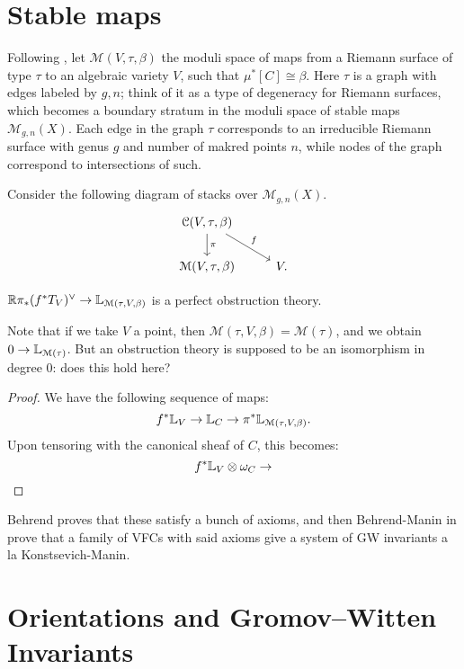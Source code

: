 \section{Stable maps}
Following \cite{bm_stacks}, let $\mathcal{M}(V,\tau,\beta)$ the moduli space of maps from a Riemann 
surface of type $\tau$ to an algebraic variety $V$,
such that $\mu^*[C] \cong \beta$. Here $\tau$ is a graph with edges labeled by $g,n$; think of it as a type of degeneracy
for Riemann surfaces, which becomes a boundary stratum in the moduli space of stable maps $\mathcal{M}_{g,n}(X)$. 
Each edge in the graph $\tau$ corresponds to an irreducible Riemann surface with genus $g$ 
and number of makred points $n$, while nodes of the graph correspond to intersections of such.

Consider the following diagram of stacks over $\mathcal{M}_{g,n}(X)$.
\[
\begin{tikzcd}
\mathcal{C}(V,\tau,\beta)\arrow{d}{\pi} \arrow{dr}{f} & \\ \mathcal{M}(V,\tau,\beta) & V .
\end{tikzcd}
\]

\begin{prop}
\label{prop:stable_maps_standard_obstruction}
$\mathbb R\pi_*(f^*T_V)^{\vee} \to \mathbb L_{\mathcal{M}(\tau,V,\beta)}$ is a perfect obstruction theory.
\end{prop}

\begin{rem}
Note that if we take
$V$ a point, then $\mathcal{M}(\tau,V,\beta) = \mathcal{M}(\tau)$, and we obtain $0 \to \mathbb L_{\mathcal{M}(\tau)}$.
But an obstruction theory is supposed to be an isomorphism in degree 0: does this hold here?
\end{rem}

\begin{proof}
We have the following sequence of maps:
\[	f^*\mathbb L_V \to \mathbb L_C \to \pi^* \mathbb L_{\mathcal{M}(\tau,V,\beta)}.	\]
Upon tensoring with the canonical sheaf of $C$, this becomes:
\[	f^*\mathbb L_V \otimes \omega_C \to	\]
\end{proof}

Behrend proves that these satisfy a bunch of axioms, and then Behrend-Manin in \cite{bm_stacks} prove that a 
family of VFCs with said axioms
give a system of GW invariants a la Konstsevich-Manin.

\section{Orientations and Gromov--Witten Invariants}


